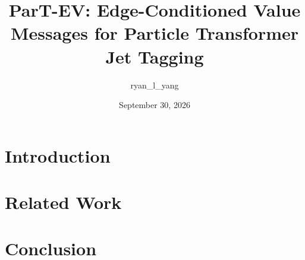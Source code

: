 \documentclass[11pt]{article}
\title{ParT-EV: Edge-Conditioned Value Messages for Particle Transformer Jet Tagging}
\author{ryan\_l\_yang}
\date{September 30, 2026}
\begin{document}
\maketitle

\section{Introduction}

\section{Related Work}



\clearpage

\clearpage

\section{Conclusion}



\end{document}
